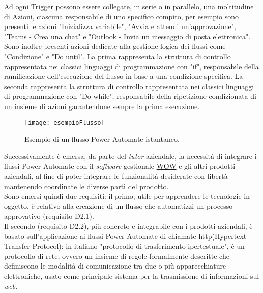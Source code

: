 \noindent Ad ogni Trigger possono essere collegate, in serie o in parallelo, una moltitudine di Azioni, ciascuna responsabile di uno specifico compito, per esempio sono presenti le azioni "Inizializza variabile", "Avvia e attendi un'approvazione", "Teams - Crea una chat" e "Outlook - Invia un messaggio di posta elettronica".\\
Sono inoltre presenti azioni dedicate alla gestione logica dei flussi come "Condizione" e "Do until". La prima rappresenta la struttura di controllo rappresentata nei classici linguaggi di programmazione con "if", responsabile della ramificazione dell'esecuzione del flusso in base a una condizione specifica.
La seconda rappresenta la struttura di controllo rappresentata nei classici linguaggi di programmazione con "Do while", responsabile della ripetizione condizionata di un insieme di azioni garantendone sempre la prima esecuzione.
\begin{figure}[htbp] 
    \centering 
    \texttt{[image: esempioFlusso]} 
    \caption{Esempio di un flusso Power Automate istantaneo.}
    \label{fig:esempioFlusso}
\end{figure}
\newline \noindent Successivamente è emersa, da parte del \emph{tutor} aziendale, la necessità di integrare i flussi Power Automate con il \emph{software} gestionale \hyperref[WOW]{WOW} e gli altri prodotti aziendali, al fine di poter integrare le funzionalità desiderate con libertà mantenendo coordinate le diverse parti del prodotto.\\
Sono emersi quindi due requisiti: il primo, utile per apprendere le tecnologie in oggetto, è relativo alla creazione di un flusso che automatizzi un processo approvativo (requisito D2.1).\\
Il secondo (requisito D2.2), più concreto e integrabile con i prodotti aziendali, è basato sull'applicazione ai flussi Power Automate di chiamate \gls{http}(Hypertext Transfer Protocol): in italiano "protocollo di trasferimento ipertestuale", è un protocollo di rete, ovvero un insieme di regole formalmente descritte che definiscono le modalità di comunicazione tra due o più apparecchiature elettroniche, usato come principale sistema per la trasmissione di informazioni sul \emph{web}.
